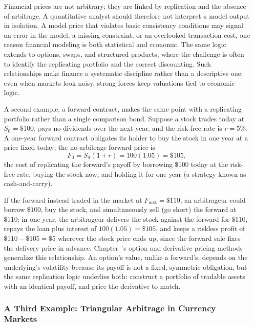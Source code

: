 \documentclass[../ai_in_finance]{subfiles}
\begin{document}
Financial prices are not arbitrary; they are linked by replication and the absence of arbitrage. A quantitative analyst should therefore not interpret a model output in isolation. A model price that violates basic consistency conditions may signal an error in the model, a missing constraint, or an overlooked transaction cost, one reason financial modeling is both statistical and economic.
The same logic extends to options, swaps, and structured products, where the challenge is often to identify the replicating portfolio and the correct discounting. Such relationships make finance a systematic discipline rather than a descriptive one: even when markets look noisy, strong forces keep valuations tied to economic logic.

A second example, a forward contract, makes the same point with a replicating portfolio rather than a single comparison bond. Suppose a stock trades today at $S_0 = \$100$, pays no dividends over the next year, and the risk-free rate is $r = 5\%$. A one-year forward contract obligates its holder to buy the stock in one year at a price fixed today; the no-arbitrage forward price is
\begin{equation*}
F_0 = S_0(1+r) = 100(1.05) = \$105,
\end{equation*}
the cost of replicating the forward's payoff by borrowing $\$100$ today at the risk-free rate, buying the stock now, and holding it for one year (a strategy known as cash-and-carry).

If the forward instead traded in the market at $F_{\text{mkt}} = \$110$, an arbitrageur could borrow $\$100$, buy the stock, and simultaneously sell (go short) the forward at $\$110$; in one year, the arbitrageur delivers the stock against the forward for $\$110$, repays the loan plus interest of $100(1.05) = \$105$, and keeps a riskless profit of $\$110 - \$105 = \$5$ wherever the stock price ends up, since the forward sale fixes the delivery price in advance. Chapter~'s option and derivative pricing methods generalize this relationship. An option's value, unlike a forward's, depends on the underlying's volatility because its payoff is not a fixed, symmetric obligation, but the same replication logic underlies both: construct a portfolio of tradable assets with an identical payoff, and price the derivative to match.

\subsubsection*{A Third Example: Triangular Arbitrage in Currency Markets}
\end{document}
